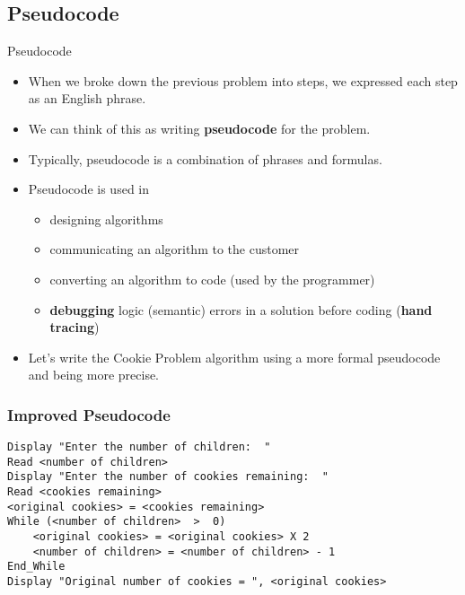 \documentclass[graphics]{beamer}
\begin{document}
\subsection{Pseudocode}
\begin{frame}{Pseudocode}
     {
        \begin{itemize}
            \item When we broke down the previous problem into steps, we expressed each step as an English phrase.
            \item We can think of this as writing \textbf{pseudocode} for the problem.
            \item Typically, pseudocode is a combination of phrases and formulas.
        \end{itemize}
    }
     {
        \begin{itemize}
            \item Pseudocode is used in
            \begin{itemize}
                \item designing algorithms
                \item communicating an algorithm to the customer
                \item converting an algorithm to code (used by the programmer)
                \item \textbf{debugging} logic (semantic) errors in a solution before coding (\textbf{hand tracing})
            \end{itemize}
            \item Let’s write the Cookie Problem algorithm using a more formal pseudocode and being more precise.
        \end{itemize}
    }
\end{frame}

\begin{frame}[fragile]\frametitle{Improved Pseudocode}\label{slide:cookieloop}
    \begin{verbatim}
Display "Enter the number of children:  "
Read <number of children>
Display "Enter the number of cookies remaining:  "
Read <cookies remaining>
<original cookies> = <cookies remaining>
While (<number of children>  >  0)
    <original cookies> = <original cookies> X 2
    <number of children> = <number of children> - 1
End_While
Display "Original number of cookies = ", <original cookies>
    \end{verbatim}
\end{frame}
\end{document}

